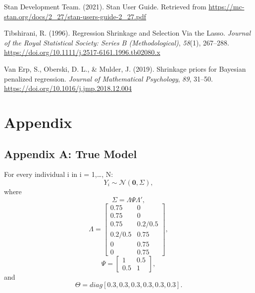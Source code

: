 \documentclass[
  man,floatsintext]{apa6}
\newlength{\cslhangindent}
\newlength{\cslentryspacingunit} %
\newenvironment{CSLReferences}[2] %
 {%
  \setlength{\parindent}{0pt}
  \ifodd #1
  \let\oldpar\par
  \def\par{\hangindent=\cslhangindent\oldpar}
  \fi
  \setlength{\parskip}{#2\cslentryspacingunit}
 }%
 {}
\begin{document}
\begin{CSLReferences}{1}{0}
\leavevmode{}%
Stan Development Team. (2021). Stan {User} {Guide}. Retrieved from \url{https://mc-stan.org/docs/2_27/stan-users-guide-2_27.pdf}

\leavevmode{}%
Tibshirani, R. (1996). Regression {Shrinkage} and {Selection} {Via} the {Lasso}. \emph{Journal of the Royal Statistical Society: Series B (Methodological)}, \emph{58}(1), 267--288. \url{https://doi.org/10.1111/j.2517-6161.1996.tb02080.x}

\leavevmode{}%
Van Erp, S., Oberski, D. L., \& Mulder, J. (2019). Shrinkage priors for {Bayesian} penalized regression. \emph{Journal of Mathematical Psychology}, \emph{89}, 31--50. \url{https://doi.org/10.1016/j.jmp.2018.12.004}

\end{CSLReferences}

\endgroup

\clearpage

\hypertarget{appendix}{%
\section{Appendix}\label{appendix}}

\hypertarget{appendix-a-true-model}{%
\subsection{Appendix A: True Model}\label{appendix-a-true-model}}

For every individual i in i = 1,\ldots, N:
\[Y_i \sim \mathcal{N}(\mathbf{0}, \Sigma),\] where
\[\Sigma = \Lambda\Psi\Lambda',\]
\[\Lambda = 
    \begin{bmatrix}
    0.75 & 0 \\
    0.75 & 0 \\
    0.75 & 0.2/0.5 \\
    0.2/0.5 & 0.75 \\
    0 & 0.75 \\
    0 & 0.75
    \end{bmatrix},\]
\[\Psi =
    \begin{bmatrix}
     1 & 0.5 \\
     0.5 & 1
    \end{bmatrix}
,\] and
\[\Theta = diag[0.3, 0.3, 0.3, 0.3, 0.3, 0.3].\]
\end{document}
